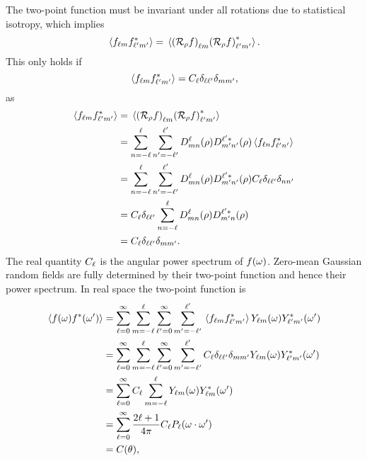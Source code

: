 The two-point function must be invariant under all rotations due to statistical isotropy, which implies
%
\begin{equation}
	\expval*{\harmonic{f} \conj{\harmonic[']{f}}}
	= \expval*{\harmonic{(\rotation{\rho}f)}\conj{\harmonic[']{(\rotation{\rho}f)}}}.
\end{equation}
%
This only holds if
%
\begin{equation}
	\expval*{\harmonic{f} \conj{\harmonic[']{f}}}
	= \powerSpectrum \delta_{\ell\ell'} \delta_{m m'},
\end{equation}
%
as
%
\begin{align}
	\expval*{\harmonic{f} \conj{\harmonic[']{f}}}
	 & = \expval*{\harmonic{(\rotation{\rho}f)}\conj{\harmonic[']{(\rotation{\rho}f)}}} \nonumber{}                                                                \\
	 & = \wignerSum \wignerSum['] \wigner{\ell}{m}{n}(\rho) \wigner[\ast]{\ell'}{m'}{n'}(\rho) \expval*{f_{\ell n} \conj{f_{\ell' n'}}} \nonumber{}         \\
	 & = \wignerSum \wignerSum['] \wigner{\ell}{m}{n}(\rho) \wigner[\ast]{\ell'}{m'}{n'}(\rho) \powerSpectrum \delta_{\ell \ell'} \delta_{n n'} \nonumber{} \\
	 & = \powerSpectrum \delta_{\ell\ell'} \wignerSum \wigner{\ell}{m}{n}(\rho) \wigner[\ast]{\ell'}{m'}{n}(\rho) \nonumber{}                               \\
	 & = \powerSpectrum \delta_{\ell\ell'} \delta_{m m'}.
\end{align}
%
The real quantity \(\powerSpectrum{}\) is the angular power spectrum of \(\pixel{f}\).
Zero-mean Gaussian random fields are fully determined by their two-point function and hence their power spectrum.
In real space the two-point function is
%
\begin{align}
	\expval*{f(\omega) \conj{f}(\omega')}
	 & = \sum\limits_{\ell=0}^{\infty} \sum\limits_{m=-\ell}^{\ell} \sum\limits_{\ell'=0}^{\infty} \sum\limits_{m'=-\ell'}^{\ell'} \expval*{\harmonic{f} \conj{\harmonic[']{f}}} \harmonic{Y}(\omega) \conj{\harmonic[']{Y}}(\omega') \nonumber{}   \\
	 & = \sum\limits_{\ell=0}^{\infty} \sum\limits_{m=-\ell}^{\ell} \sum\limits_{\ell'=0}^{\infty} \sum\limits_{m'=-\ell'}^{\ell'} \powerSpectrum \delta_{\ell\ell'} \delta_{m m'} \harmonic{Y}(\omega) \conj{\harmonic[']{Y}}(\omega') \nonumber{} \\
	 & = \sum\limits_{\ell=0}^{\infty} \powerSpectrum \sum\limits_{m=-\ell}^{\ell} \harmonic{Y}(\omega) \conj{\harmonic{Y}}(\omega') \nonumber{}                                                                                                    \\
	 & = \sum\limits_{\ell=0}^{\infty} \factor \powerSpectrum P_{\ell}(\omega\cdot\omega')  \nonumber{}                                                                                                                                             \\
	 & = C(\theta),
\end{align}
